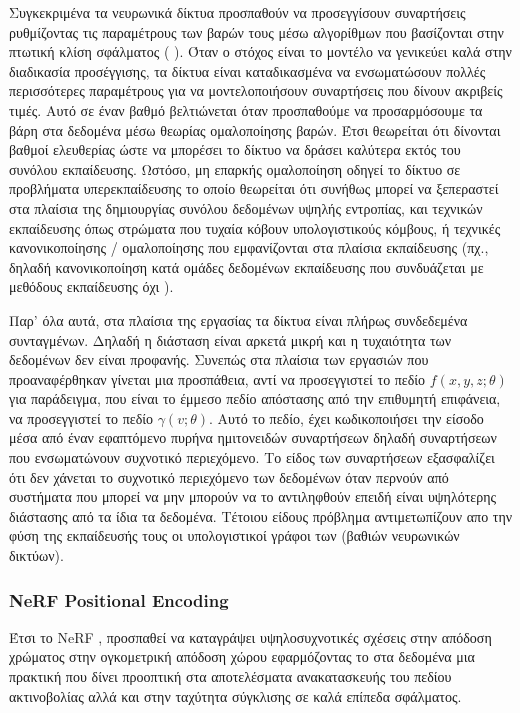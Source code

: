 Συγκεκριμένα τα νευρωνικά δίκτυα προσπαθούν να προσεγγίσουν συναρτήσεις ρυθμίζοντας τις παραμέτρους των βαρών τους μέσω αλγορίθμων που βασίζονται στην πτωτική κλίση σφάλματος ( \cite{lecun2015deep}). Όταν ο στόχος είναι το μοντέλο να γενικεύει καλά στην διαδικασία προσέγγισης, τα δίκτυα είναι καταδικασμένα να ενσωματώσουν πολλές περισσότερες παραμέτρους για να μοντελοποιήσουν συναρτήσεις που δίνουν ακριβείς τιμές. Αυτό σε έναν βαθμό βελτιώνεται όταν προσπαθούμε να προσαρμόσουμε τα βάρη στα δεδομένα μέσω θεωρίας ομαλοποίησης βαρών. Έτσι θεωρείται ότι δίνονται βαθμοί ελευθερίας ώστε να μπορέσει το δίκτυο να δράσει καλύτερα εκτός του συνόλου εκπαίδευσης. Ωστόσο, μη επαρκής ομαλοποίηση οδηγεί το δίκτυο σε προβλήματα υπερεκπαίδευσης το οποίο θεωρείται ότι συνήθως μπορεί να ξεπεραστεί στα πλαίσια της δημιουργίας συνόλου δεδομένων υψηλής εντροπίας, και τεχνικών εκπαίδευσης όπως στρώματα  που τυχαία κόβουν υπολογιστικούς κόμβους, ή τεχνικές κανονικοποίησης / ομαλοποίησης που εμφανίζονται στα πλαίσια εκπαίδευσης (πχ., δηλαδή κανονικοποίηση κατά ομάδες δεδομένων εκπαίδευσης που συνδυάζεται με μεθόδους εκπαίδευσης  όχι ). 

Παρ' όλα αυτά, στα πλαίσια της εργασίας τα δίκτυα είναι πλήρως συνδεδεμένα  συνταγμένων. Δηλαδή η διάσταση είναι αρκετά μικρή και η τυχαιότητα των δεδομένων δεν είναι προφανής. Συνεπώς στα πλαίσια των εργασιών που προαναφέρθηκαν γίνεται μια προσπάθεια, αντί να προσεγγιστεί το πεδίο $f(x,y,z;\theta)$  για παράδειγμα, που είναι το έμμεσο πεδίο απόστασης από την επιθυμητή επιφάνεια, να προσεγγιστεί το πεδίο $\gamma(v;\theta)$. Αυτό το πεδίο,  έχει κωδικοποιήσει την είσοδο μέσα από έναν εφαπτόμενο πυρήνα ημιτονειδών συναρτήσεων δηλαδή συναρτήσεων που ενσωματώνουν συχνοτικό περιεχόμενο. Το είδος των συναρτήσεων εξασφαλίζει ότι δεν χάνεται το  συχνοτικό περιεχόμενο των δεδομένων όταν περνούν από συστήματα που μπορεί να μην μπορούν να το αντιληφθούν επειδή είναι υψηλότερης διάστασης από τα ίδια τα δεδομένα. Τέτοιου είδους πρόβλημα αντιμετωπίζουν απο την φύση της εκπαίδευσής τους οι υπολογιστικοί γράφοι των (βαθιών νευρωνικών δικτύων).  


\subsubsection{ΝeRF Positional Encoding}
Έτσι το NeRF \cite{mildenhall2020nerf}, προσπαθεί να καταγράψει υψηλοσυχνοτικές σχέσεις στην απόδοση χρώματος στην ογκομετρική απόδοση χώρου εφαρμόζοντας το  στα δεδομένα μια πρακτική που δίνει προοπτική στα αποτελέσματα ανακατασκευής του πεδίου ακτινοβολίας αλλά και στην ταχύτητα σύγκλισης σε καλά επίπεδα σφάλματος.

